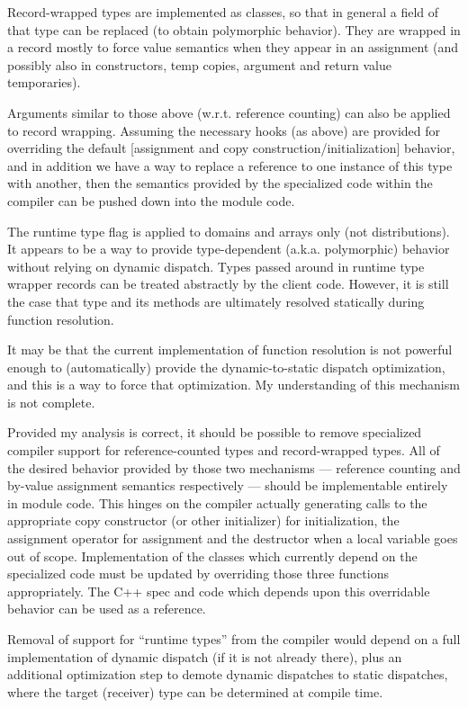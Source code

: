 Record-wrapped types are implemented as classes, so that in general a field of
that type can be replaced (to obtain polymorphic behavior).  They are wrapped in
a record mostly to force value semantics when they appear in an assignment (and
possibly also in constructors, temp copies, argument and return value
temporaries).  

Arguments similar to those above (w.r.t. reference counting) can also be applied
to record wrapping.  Assuming the necessary hooks (as above) are provided for
overriding the default [assignment and copy construction/initialization]
behavior, and in addition we have a way to replace a reference to one instance
of this type with another, then the semantics provided by the specialized code
within the compiler can be pushed down into the module code.

The runtime type flag is applied to domains and arrays only (not
distributions).  It appears to be a way to provide type-dependent
(a.k.a. polymorphic) behavior without relying on dynamic dispatch.  Types passed
around in runtime type wrapper records can be treated abstractly by the client
code.  However, it is still the case that type and its methods are ultimately
resolved statically during function resolution.  

It may be that the current
implementation of function resolution is not powerful enough to (automatically)
provide the dynamic-to-static dispatch optimization, and this is a way to force
that optimization.  My understanding of this mechanism is not complete.

\vskip 0.5in

Provided my analysis is correct, it should be possible to remove specialized
compiler support for reference-counted types and record-wrapped types.  All of
the desired behavior provided by those two mechanisms --- reference
counting and by-value assignment semantics respectively --- should be
implementable entirely in module code.  This hinges on the compiler actually
generating calls to the appropriate copy constructor (or other initializer) for
initialization, the assignment operator for assignment and the destructor when a
local variable goes out of scope.  Implementation of the classes which currently
depend on the specialized code must be updated by overriding those three
functions appropriately.  The C++ spec and code which depends upon this
overridable behavior can be used as a reference.

Removal of support for ``runtime types'' from the compiler would depend on a
full implementation of dynamic dispatch (if it is not already there), plus an
additional optimization step to demote dynamic dispatches to static dispatches,
where the target (receiver) type can be determined at compile time.

